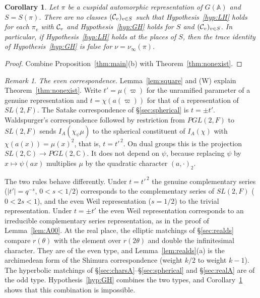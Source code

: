 \documentclass[12pt,letterpaper,openany]{book}
\theoremstyle{plain}
\newtheorem{corollary}[theorem]{Corollary}
\theoremstyle{definition}
\theoremstyle{remark}
\theoremstyle{remark}
\newtheorem{remyy}{Remark}
\begin{document}
\begin{corollary}\label{cor:inconsistent}
Let $\pi$ be a cuspidal automorphic representation of $G({\mathbb A})$
and $S=S(\pi)$. There are no classes $({\cal C}_v)_{v\in S}$ such that
Hypothesis~\ref{hyp:LH} holds for each $\pi_v$ with ${\cal C}_v$ and
Hypothesis~\ref{hyp:GH} holds for $S$ and $({\cal C}_v)_{v\in S}$. In
particular, if Hypothesis~\ref{hyp:LH} holds at the places of $S$, then
the trace identity of Hypothesis~\ref{hyp:GH} is false for
$\nu=\nu_\infty(\pi)$.
\end{corollary}

\begin{proof}
Combine Proposition~\ref{thm:main}(b) with Theorem~\ref{thm:nonexist}.
\end{proof}

\begin{remyy}\label{rem:even}
\emph{The even correspondence.} Lemma~\ref{lem:square} and (W) explain
Theorem~\ref{thm:nonexist}. Write $t'=\mu(\varpi)$ for the unramified
parameter of a genuine representation and $t=\chi(a(\varpi))$ for that of
a representation of $SL(2,F)$. The Satake correspondence of
\S\ref{sec:spherical} is $t=\pm t'$. Waldspurger's correspondence followed
by restriction from $PGL(2,F)$ to $SL(2,F)$ sends
$I_A(\chi_\psi\mu)$ to the spherical constituent of $I_A(\chi)$ with
$\chi(a(x))=\mu(x)^2$, that is, $t=t'^{\,2}$. On dual groups this is the
projection $SL(2,{\mathbb C})\rightarrow PGL(2,{\mathbb C})$. It does not
depend on $\psi$, because replacing $\psi$ by $x\mapsto\psi(ax)$ multiplies
$\mu$ by the quadratic character $(a,\cdot)_2$.

The two rules behave differently. Under $t=t'^{\,2}$ the genuine
complementary series ($|t'|=q^{-s}$, $0<s<1/2$) corresponds to the
complementary series of $SL(2,F)$ ($0<2s<1$), and the even Weil
representation ($s=1/2$) to the trivial representation. Under
$t=\pm t'$ the even Weil representation corresponds to an irreducible
complementary series representation, as in the proof of
Lemma~\ref{lem:A00}. At the real place, the elliptic matchings of
\S\ref{sec:realds} compare $r(\theta)$ with the element over
$r(2\theta)$ and double the infinitesimal character. They are of the
even type, and Lemma~\ref{lem:realds}(a) is the archimedean form of the
Shimura correspondence (weight $k/2$ to weight $k-1$). The hyperbolic
matchings of \S\ref{sec:charsA}--\S\ref{sec:spherical} and
\S\ref{sec:realA} are of the odd type. Hypothesis~\ref{hyp:GH} combines
the two types, and Corollary~\ref{cor:inconsistent} shows that this
combination is impossible.


\end{remyy}
\end{document}
